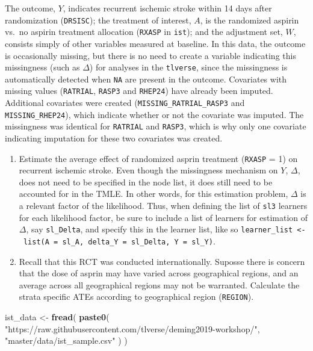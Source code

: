 \documentclass[12pt, krantz2,]{krantz}
\newenvironment{Shaded}{\begin{snugshade}}{\end{snugshade}}
\newcommand{\KeywordTok}[1]{\textcolor[rgb]{0.27,0.27,0.27}{\textbf{#1}}}
\newcommand{\NormalTok}[1]{#1}
\newcommand{\StringTok}[1]{\textcolor[rgb]{0.5,0.5,0.5}{#1}}
\providecommand{\tightlist}{%
  \setlength{\itemsep}{0pt}\setlength{\parskip}{0pt}}
\theoremstyle{definition}
\theoremstyle{definition}
\theoremstyle{definition}
\newcommand{\1}{\mathbbm{1}}
\begin{document}
The outcome, \(Y\), indicates recurrent ischemic stroke within 14 days after
randomization (\texttt{DRSISC}); the treatment of interest, \(A\), is the randomized
aspirin vs.~no aspirin treatment allocation (\texttt{RXASP} in \texttt{ist}); and the
adjustment set, \(W\), consists simply of other variables measured at baseline. In
this data, the outcome is occasionally missing, but there is no need to create a
variable indicating this missingness (such as \(\Delta\)) for analyses in the
\texttt{tlverse}, since the missingness is automatically detected when \texttt{NA} are present
in the outcome. Covariates with missing values (\texttt{RATRIAL}, \texttt{RASP3} and \texttt{RHEP24})
have already been imputed. Additional covariates were created
(\texttt{MISSING\_RATRIAL\_RASP3} and \texttt{MISSING\_RHEP24}), which indicate whether or not
the covariate was imputed. The missingness was identical for \texttt{RATRIAL} and
\texttt{RASP3}, which is why only one covariate indicating imputation for these two
covariates was created.

\begin{enumerate}
\def\labelenumi{\arabic{enumi}.}
\tightlist
\item
  Estimate the average effect of randomized asprin treatment (\texttt{RXASP} = 1) on
  recurrent ischemic stroke. Even though the missingness mechanism on \(Y\),
  \(\Delta\), does not need to be specified in the node list, it does still need
  to be accounted for in the TMLE. In other words, for this estimation problem,
  \(\Delta\) is a relevant factor of the likelihood. Thus, when defining the
  list of \texttt{sl3} learners for each likelihood factor, be sure to include a list
  of learners for estimation of \(\Delta\), say \texttt{sl\_Delta}, and specify this in
  the learner list, like so
  \texttt{learner\_list\ \textless{}-\ list(A\ =\ sl\_A,\ delta\_Y\ =\ sl\_Delta,\ Y\ =\ sl\_Y)}.
\item
  Recall that this RCT was conducted internationally. Suposse there is concern
  that the dose of asprin may have varied across geographical regions, and an
  average across all geographical regions may not be warranted. Calculate the
  strata specific ATEs according to geographical region (\texttt{REGION}).
\end{enumerate}

\begin{Shaded}
\begin{Highlighting}[]
\NormalTok{ist_data <-}\StringTok{ }\KeywordTok{fread}\NormalTok{(}
  \KeywordTok{paste0}\NormalTok{(}
    \StringTok{"https://raw.githubusercontent.com/tlverse/deming2019-workshop/"}\NormalTok{,}
    \StringTok{"master/data/ist_sample.csv"}
\NormalTok{  )}
\NormalTok{)}
\end{Highlighting}
\end{Shaded}
\end{document}
